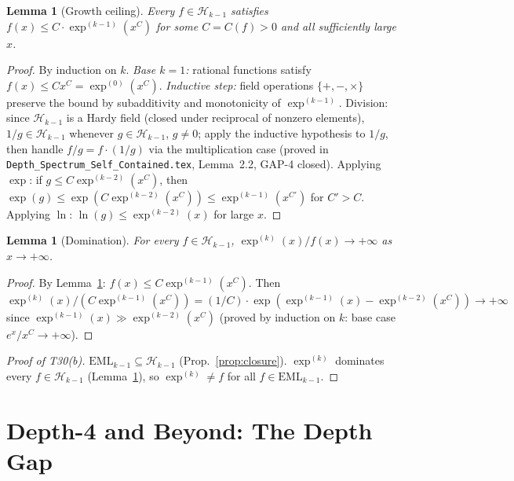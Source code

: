 \documentclass[12pt,a4paper]{article}
\newtheorem{lemma}[theorem]{Lemma}
\theoremstyle{definition}
\theoremstyle{remark}
\begin{document}
\begin{lemma}[Growth ceiling]\label{lem:growthcap}
Every $f \in \mathcal{H}_{k-1}$ satisfies $f(x) \leq C \cdot \exp^{(k-1)}(x^C)$
for some $C = C(f) > 0$ and all sufficiently large $x$.
\end{lemma}
\begin{proof}
By induction on $k$.
\textit{Base $k=1$:} rational functions satisfy $f(x) \leq C x^C = \exp^{(0)}(x^C)$.
\textit{Inductive step:} field operations $\{+,-,\times\}$ preserve the bound
by subadditivity and monotonicity of $\exp^{(k-1)}$.
Division: since $\mathcal{H}_{k-1}$ is a Hardy field (closed under reciprocal of nonzero
elements), $1/g \in \mathcal{H}_{k-1}$ whenever $g \in \mathcal{H}_{k-1}$, $g \neq 0$;
apply the inductive hypothesis to $1/g$, then handle $f/g = f \cdot (1/g)$ via the
multiplication case (proved in \texttt{Depth\_Spectrum\_Self\_Contained.tex},
Lemma~2.2, GAP-4 closed).
Applying $\exp$: if $g \leq C \exp^{(k-2)}(x^C)$, then
$\exp(g) \leq \exp(C \exp^{(k-2)}(x^C)) \leq \exp^{(k-1)}(x^{C'})$ for $C' > C$.
Applying $\ln$: $\ln(g) \leq \exp^{(k-2)}(x)$ for large $x$.
\end{proof}

\begin{lemma}[Domination]\label{lem:dom}
For every $f \in \mathcal{H}_{k-1}$, $\exp^{(k)}(x)/f(x) \to +\infty$ as $x \to +\infty$.
\end{lemma}
\begin{proof}
By Lemma~\ref{lem:growthcap}: $f(x) \leq C \exp^{(k-1)}(x^C)$.
Then $\exp^{(k)}(x) / (C \exp^{(k-1)}(x^C))
= (1/C) \cdot \exp(\exp^{(k-1)}(x) - \exp^{(k-2)}(x^C)) \to +\infty$
since $\exp^{(k-1)}(x) \gg \exp^{(k-2)}(x^C)$ (proved by induction on $k$:
base case $e^x / x^C \to +\infty$).
\end{proof}

\begin{proof}[Proof of T30(b)]
$\mathrm{EML}_{k-1} \subseteq \mathcal{H}_{k-1}$ (Prop.~\ref{prop:closure}).
$\exp^{(k)}$ dominates every $f \in \mathcal{H}_{k-1}$ (Lemma~\ref{lem:dom}),
so $\exp^{(k)} \neq f$ for all $f \in \mathrm{EML}_{k-1}$.
\end{proof}

\section{Depth-4 and Beyond: The Depth Gap}
\label{sec:depth4}
\end{document}
